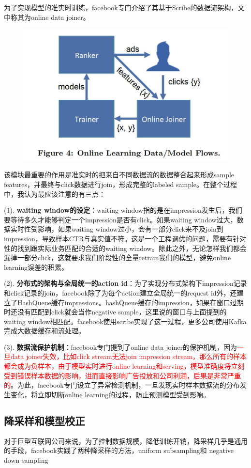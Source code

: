 \documentclass[12pt]{article}
\begin{document}
为了实现模型的准实时训练，facebook专门介绍了其基于Scribe的数据流架构，文中称其为online data joiner。
\begin{figure}[H]
    \centering
    \includegraphics[width=.6\textwidth]{fig/Facebook_Online_Data_Joiner.jpg}
\end{figure}

该模块最重要的作用是准实时的把来自不同数据流的数据整合起来形成sample features，并最终与click数据进行join，形成完整的labeled sample。在整个过程中，我认为最应该注意的有三点：

(1). \textbf{waiting window的设定}：waiting window指的是在impression发生后，我们要等待多久才能够判定一个impression是否有click。如果waiting window过大，数据实时性受影响，如果waiting window过小，会有一部分click来不及join到impression，导致样本CTR与真实值不符。这是一个工程调优的问题，需要有针对性的找到跟实际业务匹配的合适的waiting window。除此之外，无论怎样我们都会漏掉一部分click，这就要求我们阶段性的全量retrain我们的模型，避免online learning误差的积累。

(2). \textbf{分布式的架构与全局统一的action id}：为了实现分布式架构下impression记录和click记录的join，facebook除了为每个action建立全局统一的request id外，还建立了HashQueue缓存impressions。hashQueue缓存的impression，如果在窗口过期时还没有匹配到click就会当作negative sample，这里说的窗口与上面提到的waiting window相匹配。facebook使用scribe实现了这一过程，更多公司使用Kafka完成大数据缓存和流处理。

(3). \textbf{数据流保护机制}：facebook专门提到了online data joiner的保护机制，因为\textcolor{red}{一旦data joiner失效，比如click stream无法join impression stream，那么所有的样本都会成为负样本，由于模型实时进行online learning和serving，模型准确度将立刻受到错误样本数据的影响，进而直接影响广告投放和公司利润，后果是非常严重的}。为此，facebook专门设立了异常检测机制，一旦发现实时样本数据流的分布发生变化，将立即切断online learning的过程，防止预测模型受到影响。

\subsection{降采样和模型校正}
对于巨型互联网公司来说，为了控制数据规模，降低训练开销，降采样几乎是通用的手段，facebook实践了两种降采样的方法，uniform subsampling和 negative down sampling
\end{document}
